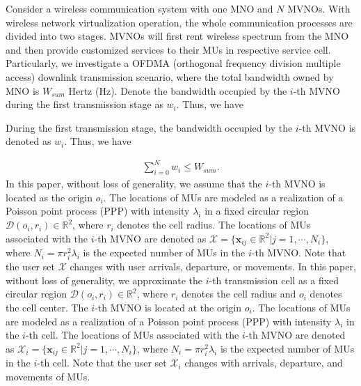 \documentclass[journal]{IEEEtran}
\begin{document}
\begin{IEEEkeywords}
Consider a wireless communication system with one MNO and $N$ MVNOs. With wireless network virtualization operation, the whole communication processes are divided into two stages. MVNOs will first rent wireless spectrum from the MNO and then provide customized services to their MUs in respective service cell. Particularly, we investigate a OFDMA (orthogonal frequency division multiple access) downlink transmission scenario, where the total bandwidth owned by MNO is $W_{sum}$ Hertz (Hz). 
Denote the bandwidth occupied by the $i$-th MVNO during the first transmission stage as $w_i$. Thus, we have

During the first transmission stage, the bandwidth occupied by the $i$-th MVNO is denoted as $w_i$. Thus, we have

\begin{align}
\sum_{i = 0}^{N} w_i \leq W_{sum}.
\end{align}
In this paper, without loss of generality, we assume that the $i$-th MVNO is located as the origin $o_i$. The locations of MUs are modeled as a realization of a Poisson point process (PPP) with intensity $\lambda_i$ in a fixed circular region $\mathcal{D}(o_i, r_i) \in \mathbb{R}^2$, where $r_i$ denotes the cell radius. The locations of MUs associated with the $i$-th MVNO are denoted as $\mathcal{X} = \{\mathbf{x}_{ij} \in \mathbb{R}^2 | j = 1, \cdots, N_i\}$, where $N_i = \pi r_i^2 \lambda_i$ is the expected number of MUs in the $i$-th MVNO. Note that the user set $\mathcal{X}$ changes with user arrivals, departure, or movements.
In this paper, without loss of generality, we approximate the $i$-th transmission cell as a fixed circular region $\mathcal{D}(o_i, r_i) \in \mathbb{R}^2$, where $r_i$ denotes the cell radius and $o_i$ denotes the cell center. The $i$-th MVNO is located at the origin $o_i$. The locations of MUs are modeled as a realization of a Poisson point process (PPP) with intensity $\lambda_i$ in the $i$-th cell. The locations of MUs associated with the $i$-th MVNO are denoted as $\mathcal{X}_i = \{\mathbf{x}_{ij} \in \mathbb{R}^2 | j = 1, \cdots, N_i\}$, where $N_i = \pi r_i^2 \lambda_i$ is the expected number of MUs in the $i$-th cell. Note that the user set $\mathcal{X}_i$ changes with arrivals, departure, and movements of MUs.


\end{IEEEkeywords}
\end{document}
